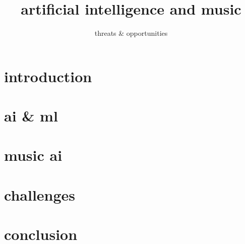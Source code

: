 

\title{artificial intelligence and music}
\subtitle{threats \& opportunities} 


	

    \section[intro]{introduction}
        

    \section{ai \& ml}
        
        
    \section{music ai}
        
    
    \section[challenges]{challenges}
        
        
    \section{conclusion}
        
        



